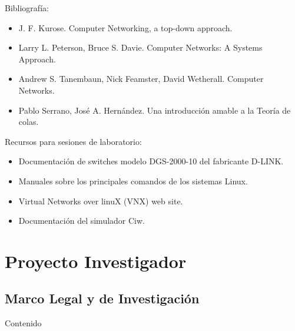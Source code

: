 \documentclass[xcolor=table,xcolor=x11names]{beamer}
\begin{document}
\begin{frame}{\subsecname}
    \small


Bibliografía:


\begin{itemize}


    \item J. F. Kurose. Computer Networking, a top-down approach.

    \item Larry L. Peterson, Bruce
S. Davie. {Computer Networks: A Systems
        Approach}.  
    
    \item Andrew S.
Tanembaun, Nick Feamster, David
Wetherall. {Computer Networks}.
    
    \item Pablo Serrano, José A. Hernández. {Una introducción amable a la Teoría de colas}.
    
\end{itemize}
	
	 


Recursos para sesiones de laboratorio:
\begin{itemize}
    \item Documentación de switches modelo DGS-2000-10 del fabricante D-LINK. 
    \item Manuales sobre los principales comandos de los sistemas Linux.
    \item Virtual Networks over linuX (VNX) web site. 
    \item Documentación del simulador Ciw.
\end{itemize}


\end{frame}









\section{Proyecto Investigador}
\subsection{Marco Legal y de Investigación}

\begin{frame}[allowframebreaks]{Contenido}
    \tableofcontents[currentsubsection]
\end{frame}
\end{document}
